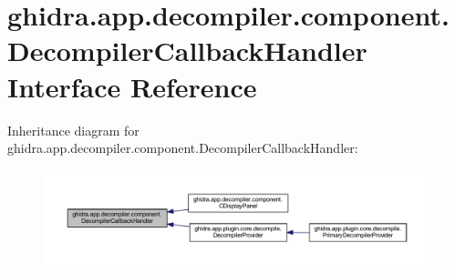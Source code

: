 \hypertarget{interfaceghidra_1_1app_1_1decompiler_1_1component_1_1_decompiler_callback_handler}{}\section{ghidra.\+app.\+decompiler.\+component.\+Decompiler\+Callback\+Handler Interface Reference}
\label{interfaceghidra_1_1app_1_1decompiler_1_1component_1_1_decompiler_callback_handler}


Inheritance diagram for ghidra.\+app.\+decompiler.\+component.\+Decompiler\+Callback\+Handler\+:
\nopagebreak
\begin{figure}[H]
\begin{center}
\leavevmode
\includegraphics[width=350pt]{interfaceghidra_1_1app_1_1decompiler_1_1component_1_1_decompiler_callback_handler__inherit__graph}
\end{center}
\end{figure}
